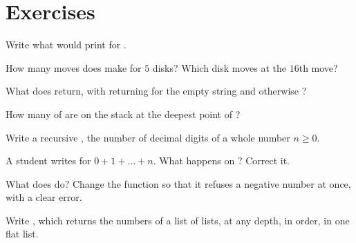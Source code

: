 \section{Exercises}\label{sec:g12:recursion:exercises}

\begin{exercise}[$\star$]\label{exo:g12:recursion:1}
Write what  would print for .
\end{exercise}

\begin{exercise}[$\star$]\label{exo:g12:recursion:2}
How many moves does  make for $5$ disks? Which disk moves at the $16$th move?
\end{exercise}

\begin{exercise}[$\star$]\label{exo:g12:recursion:3}
What does  return, with  returning  for the empty string and
otherwise ?
\end{exercise}

\begin{exercise}[$\star$]\label{exo:g12:recursion:4}
How many  of  are on the stack at the deepest point of ?
\end{exercise}

\begin{exercise}[$\star$]\label{exo:g12:recursion:5}
Write a recursive , the number of decimal digits of a whole number $n \ge 0$.
\end{exercise}

\begin{exercise}[$\star\star$]\label{exo:g12:recursion:6}
A student writes  for $0 + 1 + \dots + n$. What happens on
? Correct it.
\end{exercise}

\begin{exercise}[$\star\star$]\label{exo:g12:recursion:7}
What does  do? Change the function so that it refuses a negative number at once, with a
clear error.
\end{exercise}

\begin{exercise}[$\star\star$]\label{exo:g12:recursion:8}
Write , which returns the numbers of a list of lists, at any depth, in order, in one flat list.
\end{exercise}

